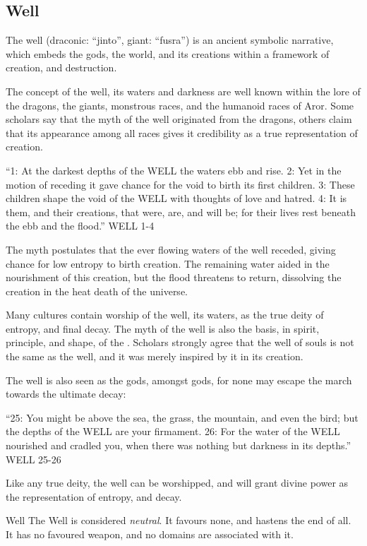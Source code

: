 \subsection{Well}
\label{sec:Well}

The well (draconic: ``jinto'', giant: ``fusra'') is an ancient symbolic
narrative, which embeds the gods, the world, and its creations within a
framework of creation, and destruction.

The concept of the well, its waters and darkness are well known within the
lore of the dragons, the giants, monstrous races, and the humanoid races of
Aror.  Some scholars say that the myth of the well originated from the
dragons, others claim that its appearance among all races gives it credibility
as a true representation of creation.

\begin{displayquote}
  ``1: At the darkest depths of the WELL the waters ebb and rise. 2: Yet in the
  motion of receding it gave chance for the void to birth its first children. 3:
  These children shape the void of the WELL with thoughts of love and hatred. 4:
  It is them, and their creations, that were, are, and will be; for their lives
  rest beneath the ebb and the flood.'' WELL 1-4
\end{displayquote}

The myth postulates that the ever flowing waters of the well receded, giving
chance for low entropy to birth creation. The remaining water aided in the
nourishment of this creation, but the flood threatens to return, dissolving
the creation in the heat death of the universe.

Many cultures contain worship of the well, its waters, as the true deity of
entropy, and final decay. The myth of the well is also the basis, in spirit,
principle, and shape, of the . Scholars strongly agree
that the well of souls is not the same as the well, and it was merely inspired
by it in its creation.

The well is also seen as the gods, amongst gods, for none may escape the march
towards the ultimate decay:

\begin{displayquote}
  ``25: You might be above the sea, the grass, the mountain, and even the bird;
  but the depths of the WELL are your firmament. 26: For the water of the WELL
  nourished and cradled you, when there was nothing but darkness in its
  depths.'' WELL 25-26
\end{displayquote}

Like any true deity, the well can be worshipped, and will grant divine power as
the representation of entropy, and decay.

\begin{35e}{Well}
  The Well is considered \emph{neutral}. It favours none, and hastens the end of
  all. It has no favoured weapon, and no domains are associated with it.
\end{35e}
